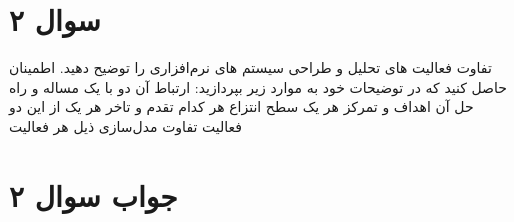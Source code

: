\section*{سوال ۲}

تفاوت فعالیت های تحلیل و طراحی سیستم های نرم‌افزاری را توضیح دهید. اطمینان حاصل کنید که در توضیحات خود به موارد زیر بپردازید:
ارتباط آن دو با یک مساله و راه حل آن
اهداف و تمرکز هر یک
سطح انتزاع هر کدام
تقدم و تاخر هر یک از این دو فعالیت
تفاوت مدل‌سازی ذیل هر فعالیت

\section*{جواب سوال ۲}

